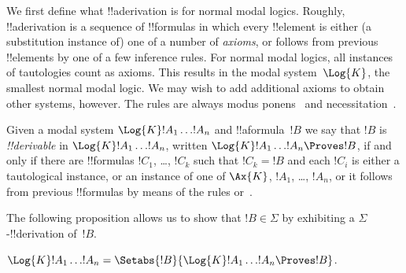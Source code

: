 \documentclass[../../../include/open-logic-section]{subfiles}
\begin{document}

We first define what !!a{derivation} is for normal modal
logics. Roughly, !!a{derivation} is a sequence of !!{formula}s in
which every !!{element} is either (a substitution instance of) one of
a number of \emph{axioms}, or follows from previous !!{element}s by
one of a few inference rules. For normal modal logics, all instances
of tautologies
count as axioms. This results in the modal system~$\Log{K}$, the
smallest normal modal logic. We may wish to add additional axioms to
obtain other systems, however. The rules are always modus ponens~\MP{}
and necessitation~\Nec.

\begin{defn}
  Given a modal system $\Log{K} !A_1 \dots !A_n$ and !!a{formula}~$!B$
  we say that $!B$ is \emph{!!{derivable}} in $\Log{K} !A_1 \dots
  !A_n$, written $\Log{K} !A_1 \dots !A_n \Proves !B$, if and only if
  there are !!{formula}s $!C_1$, \dots, $!C_k$ such that $!C_k = !B$
  and each $!C_i$ is either a tautological instance, or an instance of
  one of $\Ax{K}$, $!A_1$,
  \dots, $!A_n$, or it follows from previous !!{formula}s by means of
  the rules \MP{} or~\Nec.
\end{defn}

The following proposition allows us to show that $!B \in \Sigma$
by exhibiting a $\Sigma$-!!{derivation} of~$!B$.

\begin{prop}
  $\Log{K} !A_1 \dots !A_n = \Setabs{!B}{\Log{K} !A_1 \dots !A_n \Proves !B}$.
\end{prop}
\end{document}
